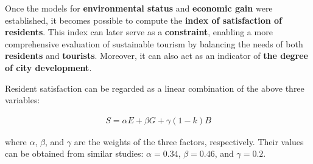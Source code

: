 \documentclass[UTF8]{mcmthesis}
\begin{document}
        \hspace*{2em} Once the models for \textbf{environmental status} and \textbf{economic gain} were established, it becomes possible to compute the \textbf{index of satisfaction of residents}. This index can later serve as a \textbf{constraint}, enabling a more comprehensive evaluation of sustainable tourism by balancing the needs of both \textbf{residents} and \textbf{tourists}. Moreover, it can also act as an indicator of \textbf{the degree of city development}.
        



    Resident satisfaction can be regarded as a linear combination of the above three variables:

    \begin{equation}
        \begin{aligned}
S = \alpha E+\beta G +\gamma(1-k)B
        \end{aligned}
        \end{equation}

        where $\alpha$, $\beta$, and $\gamma$ are the weights of the three factors, respectively. Their values can be obtained from similar studies\cite{Cottrell}: $\alpha = 0.34$, $\beta = 0.46$, and $\gamma = 0.2$.
\end{document}
